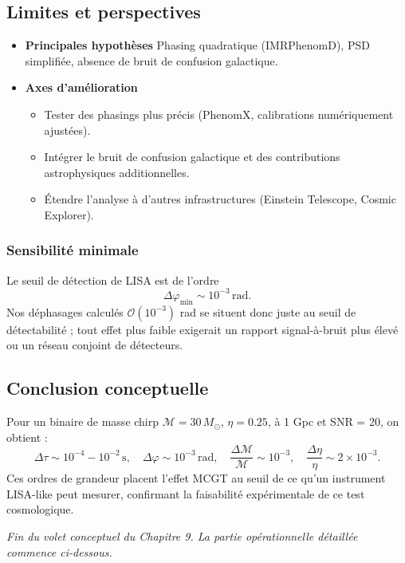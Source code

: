 \subsection{Limites et perspectives}
\begin{itemize}
  \item \textbf{Principales hypothèses}
    Phasing quadratique (IMRPhenomD), PSD simplifiée, absence de bruit de confusion galactique.
  \item \textbf{Axes d’amélioration}
    \begin{itemize}
      \item Tester des phasings plus précis (PhenomX, calibrations numériquement ajustées).
      \item Intégrer le bruit de confusion galactique et des contributions astrophysiques additionnelles.
      \item Étendre l’analyse à d’autres infrastructures (Einstein Telescope, Cosmic Explorer).
    \end{itemize}
\end{itemize}

\subsubsection*{Sensibilité minimale}
Le seuil de détection de LISA est de l’ordre
\[
  \Delta\varphi_{\min}\sim10^{-3}\,\mathrm{rad}.
\]
Nos déphasages calculés \(\mathcal{O}(10^{-3})\) rad se situent donc juste au seuil de détectabilité ;
tout effet plus faible exigerait un rapport signal-à-bruit plus élevé ou un réseau conjoint de détecteurs.

\subsection{Conclusion conceptuelle}
Pour un binaire de masse chirp \(\mathcal{M}=30\,M_{\odot}\), \(\eta=0.25\), à 1 Gpc et SNR = 20, on obtient :
\[
  \Delta\tau \sim 10^{-4}\!-\!10^{-2}\,\mathrm{s},
  \quad
  \Delta\varphi \sim 10^{-3}\,\mathrm{rad},
  \quad
  \frac{\Delta\mathcal{M}}{\mathcal{M}} \sim 10^{-3},
  \quad
  \frac{\Delta\eta}{\eta} \sim 2\times10^{-3}.
\]
Ces ordres de grandeur placent l’effet MCGT au seuil de ce qu’un instrument LISA-like peut mesurer, confirmant la faisabilité expérimentale de ce test cosmologique.

\noindent\emph{Fin du volet conceptuel du Chapitre 9. La partie opérationnelle détaillée commence ci-dessous.}
